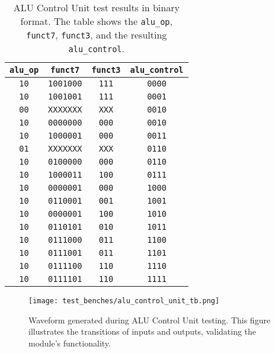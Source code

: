 \documentclass[12pt]{article}
\begin{document}
\begin{table}[ht!]
    \centering
    \renewcommand{\arraystretch}{1.1}
    \setlength{\tabcolsep}{2pt}
    \begin{tabular}{|c|c|c|c|}
        \hline
        \textbf{\texttt{alu\_op}} & \textbf{\texttt{funct7}} & \textbf{\texttt{funct3}} & \textbf{\texttt{alu\_control}} \\
        \hline
        \texttt{10} & \texttt{1001000} & \texttt{111} & \texttt{0000} \\
        \texttt{10} & \texttt{1001001} & \texttt{111} & \texttt{0001} \\
        \texttt{00} & \texttt{XXXXXXX} & \texttt{XXX} & \texttt{0010} \\
        \texttt{10} & \texttt{0000000} & \texttt{000} & \texttt{0010} \\
        \texttt{10} & \texttt{1000001} & \texttt{000} & \texttt{0011} \\
        \texttt{01} & \texttt{XXXXXXX} & \texttt{XXX} & \texttt{0110} \\
        \texttt{10} & \texttt{0100000} & \texttt{000} & \texttt{0110} \\
        \texttt{10} & \texttt{1000011} & \texttt{100} & \texttt{0111} \\
        \texttt{10} & \texttt{0000001} & \texttt{000} & \texttt{1000} \\
        \texttt{10} & \texttt{0110001} & \texttt{001} & \texttt{1001} \\
        \texttt{10} & \texttt{0000001} & \texttt{100} & \texttt{1010} \\
        \texttt{10} & \texttt{0110101} & \texttt{010} & \texttt{1011} \\
        \texttt{10} & \texttt{0111000} & \texttt{011} & \texttt{1100} \\
        \texttt{10} & \texttt{0111001} & \texttt{011} & \texttt{1101} \\
        \texttt{10} & \texttt{0111100} & \texttt{110} & \texttt{1110} \\
        \texttt{10} & \texttt{0111101} & \texttt{110} & \texttt{1111} \\
        \hline
    \end{tabular}
    \caption{ALU Control Unit test results in binary format. The table shows the \texttt{alu\_op}, \texttt{funct7}, \texttt{funct3}, and the resulting \texttt{alu\_control}.}
    \label{tab:alu_control_results}
\end{table}

\begin{figure}[ht!]
    \centering
    \texttt{[image: test\_benches/alu\_control\_unit\_tb.png]}
    \caption{Waveform generated during ALU Control Unit testing. This figure illustrates the transitions of inputs and outputs, validating the module's functionality.}
    \label{fig:alu_control_waveform}
\end{figure}
\end{document}
